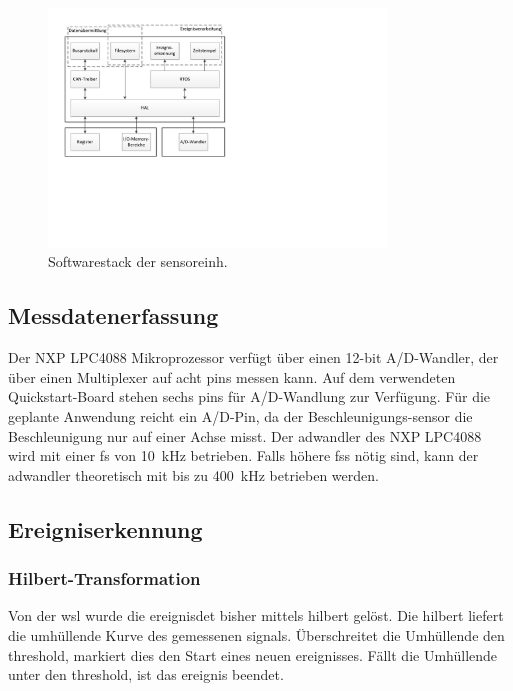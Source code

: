 \begin{figure}
	\centering
		\includegraphics[width=0.8\textwidth]{images/visio/Softwarestack_Sensor.pdf}
	\caption{Softwarestack der \gls{sensoreinh}.}
	\label{fig.sw_sensor}
\end{figure}



\subsection{Messdatenerfassung}\label{subsec.sw_messen}
Der NXP LPC4088 Mikroprozessor verfügt über einen 12-bit A/D-Wandler, der über einen Multiplexer auf acht \glspl{pin} messen kann. Auf dem verwendeten Quickstart-Board stehen sechs \glspl{pin} für A/D-Wandlung zur Verfügung. Für die geplante Anwendung reicht ein A/D-Pin, da der Beschleunigungs-\gls{sensor} die Beschleunigung nur auf einer Achse misst. Der \gls{adwandler} des NXP LPC4088 wird mit einer \gls{fs} von 10~kHz betrieben. Falls höhere \glspl{fs} nötig sind, kann der \gls{adwandler} theoretisch mit bis zu 400~kHz betrieben werden.



\subsection{Ereigniserkennung}\label{subsec.sw_ereignis}
\subsubsection{Hilbert-Transformation}
Von der \gls{wsl} wurde die \gls{ereignisdet} bisher mittels \gls{hilbert} gelöst. Die \gls{hilbert} liefert die umhüllende Kurve des gemessenen \gls{signal}s. Überschreitet die Umhüllende den \gls{threshold}, markiert dies den Start eines neuen \gls{ereignis}ses. Fällt die Umhüllende unter den \gls{threshold}, ist das \gls{ereignis} beendet.

